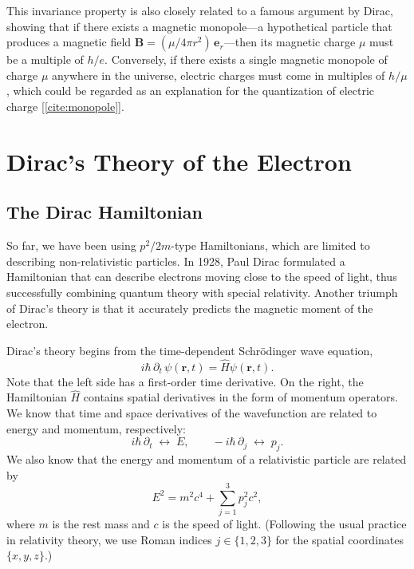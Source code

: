 \documentclass[prx,12pt]{revtex4-2}
\begin{document}
This invariance property is also closely related to a famous argument
by Dirac, showing that if there exists a magnetic monopole---a
hypothetical particle that produces a magnetic field $\mathbf{B} =
(\mu/4\pi r^2)\, \mathbf{e}_r$---then its magnetic charge $\mu$ must
be a multiple of $h/e$.  Conversely, if there exists a single magnetic
monopole of charge $\mu$ anywhere in the universe, electric charges
must come in multiples of $h/\mu$, which could be regarded as an
explanation for the quantization of electric charge
[\ref{cite:monopole}].

\section{Dirac's Theory of the Electron}

\subsection{The Dirac Hamiltonian}
\label{sec:DiracH}

So far, we have been using $p^2/2m$-type Hamiltonians, which are
limited to describing non-relativistic particles.  In 1928, Paul Dirac
formulated a Hamiltonian that can describe electrons moving close to
the speed of light, thus successfully combining quantum theory with
special relativity. Another triumph of Dirac's theory is that it
accurately predicts the magnetic moment of the electron.

Dirac's theory begins from the time-dependent Schr\"odinger wave
equation,
\begin{equation}
  i\hbar\, \partial_t\, \psi(\mathbf{r},t)
  = \hat{H} \psi(\mathbf{r},t).
  \label{schrod}
\end{equation}
Note that the left side has a first-order time derivative.  On the
right, the Hamiltonian $\hat{H}$ contains spatial derivatives in the
form of momentum operators.  We know that time and space derivatives
of the wavefunction are related to energy and momentum, respectively:
\begin{equation}
    i\hbar\, \partial_t\; \leftrightarrow \;
    E, \qquad
    -i\hbar\, \partial_j \;\leftrightarrow \;
    p_j.
\end{equation}
We also know that the energy and momentum of a relativistic particle
are related by
\begin{equation}
  E^2 = m^2c^4 + \sum_{j=1}^3 p_j^2c^2,
  \label{Erelativistic}
\end{equation}
where $m$ is the rest mass and $c$ is the speed of light.  (Following
the usual practice in relativity theory, we use Roman indices $j \in
\{1,2,3\}$ for the spatial coordinates $\{x,y,z\}$.)
\end{document}
